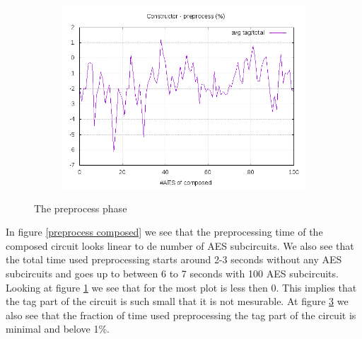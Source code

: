 \documentclass[10pt,a4paper]{article}
\begin{document}
\begin{figure}[h]
\begin{subfigure}[t]{0.3\textwidth}
        \caption{}
        \label{preprocess tag}
    \end{subfigure}
    \begin{subfigure}[t]{0.3\textwidth}
        \includegraphics[width=\textwidth]{const_preprocess_frac}
        \caption{}
        \label{preprocess frac}
    \end{subfigure}
    \caption{The preprocess phase}
\end{figure}

In figure \ref{preprocess composed} we see that the preprocessing time of the composed circuit looks linear to de number of AES subcircuits. We also see that the total time used preprocessing starts around 2-3 seconds without any AES subcircuits and goes up to between 6 to 7 seconds with 100 AES subcircuits. 
Looking at figure \ref{preprocess tag} we see that for the most plot is less then 0. This implies that the tag part of the circuit is such small that it is not mesurable. 
At figure \ref{preprocess frac} we also see that the fraction of time used preprocessing the tag part of the circuit is minimal and belove 1\%.
\end{document}
